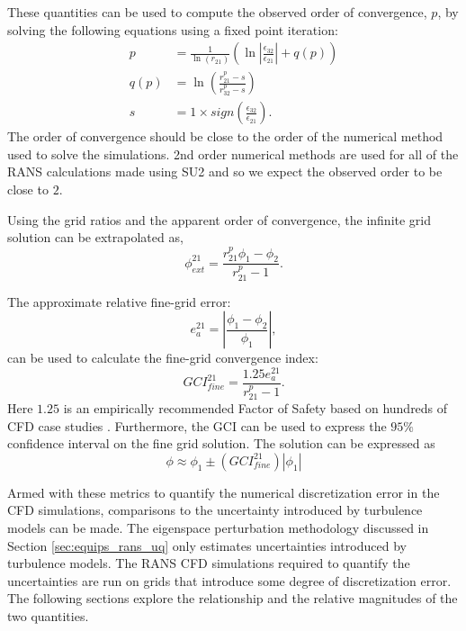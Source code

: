 These quantities can be used to compute the observed order of convergence, $p$, by solving the following equations using a fixed point iteration:
\begin{align}
    p & = \frac{1}{\ln{\left ( r_{21} \right )}} \left ( \ln{\left \vert \frac{\epsilon_{32}}{\epsilon_{21}} \right \vert } + q(p) \right )
    \\
    q(p) & = \ln{ \left ( \frac{r_{21}^{p} - s }{r_{32}^{p} - s}\right )}
    \\
    s & = 1\times sign \left ( \frac{\epsilon_{32}}{\epsilon_{21}}\right ).
\end{align}
The order of convergence should be close to the order of the numerical method used to solve the simulations. 
2nd order numerical methods are used for all of the RANS calculations made using SU2 and so we expect the observed order to be close to $2$.

Using the grid ratios and the apparent order of convergence, the infinite grid solution can be extrapolated as,
\begin{equation}
    \phi_{ext}^{21} = \frac{r_{21}^p\phi_1 - \phi_2}{r_{21}^p - 1}.
\end{equation}

The approximate relative fine-grid error: 
\begin{equation}
    e_a^{21} = \left \vert \frac{\phi_1 - \phi_2}{\phi_1} \right \vert,
\end{equation}
can be used to calculate the fine-grid convergence index:
\begin{equation}
    GCI_{fine}^{21} = \frac{1.25e_a^{21}}{r^p_{21}-1}.
\end{equation}
Here $1.25$ is an empirically recommended Factor of Safety based on hundreds of CFD case studies \cite{roache1998verification}.
Furthermore, the GCI can be used to express the $95\%$ confidence interval on the fine grid solution. 
The solution can be expressed as
\begin{equation} \label{equ:num_error_bars}
    \phi \approx \phi_1 \pm \left( GCI_{fine}^{21} \right)\left \vert \phi_1 \right \vert 
\end{equation}


Armed with these metrics to quantify the numerical discretization error in the CFD simulations, comparisons to the uncertainty introduced by turbulence models can be made. 
The eigenspace perturbation methodology discussed in Section \ref{sec:equips_rans_uq} only estimates uncertainties introduced by turbulence models.
The RANS CFD simulations required to quantify the uncertainties are run on grids that introduce some degree of discretization error.
The following sections explore the relationship and the relative magnitudes of the two quantities.

